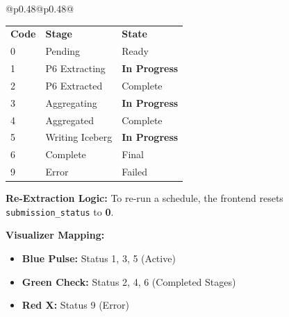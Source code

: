 \documentclass[10pt, a4paper]{article}
\begin{document}
{\begin{tabular}[t]{@{}p{0.48\textwidth}@{\hspace{0.02\textwidth}}p{0.48\textwidth}@{}}
    \vspace{0.2em}
    
    {\footnotesize
    \renewcommand{\arraystretch}{1.15}
    \begin{tabularx}{\linewidth}{@{}lXl@{}}
    \rowcolor{black!10}
    \textbf{Code} & \textbf{Stage} & \textbf{State} \\
    \rowcolor{white}
    0 & Pending & Ready \\
    \rowcolor{black!5}
    1 & P6 Extracting & \textbf{In Progress} \\
    \rowcolor{white}
    2 & P6 Extracted & Complete \\
    \rowcolor{black!5}
    3 & Aggregating & \textbf{In Progress} \\
    \rowcolor{white}
    4 & Aggregated & Complete \\
    \rowcolor{black!5}
    5 & Writing Iceberg & \textbf{In Progress} \\
    \rowcolor{white}
    6 & Complete & Final \\
    \rowcolor{black!5}
    9 & Error & Failed \\
    \end{tabularx}
    \renewcommand{\arraystretch}{1.0}
    }

    \vspace{0.3em}


    \vspace{0.1em}

    {\footnotesize
    \textbf{Re-Extraction Logic:}
    To re-run a schedule, the frontend resets \texttt{submission\_status} to \textbf{0}.
    
    \vspace{0.15em}
    \textbf{Visualizer Mapping:}
    \begin{itemize}[leftmargin=1em, itemsep=0em]
        \item \textbf{Blue Pulse:} Status 1, 3, 5 (Active)
        \item \textbf{Green Check:} Status 2, 4, 6 (Completed Stages)
        \item \textbf{Red X:} Status 9 (Error)
    \end{itemize}
    }

\end{tabular}
}
\end{document}
